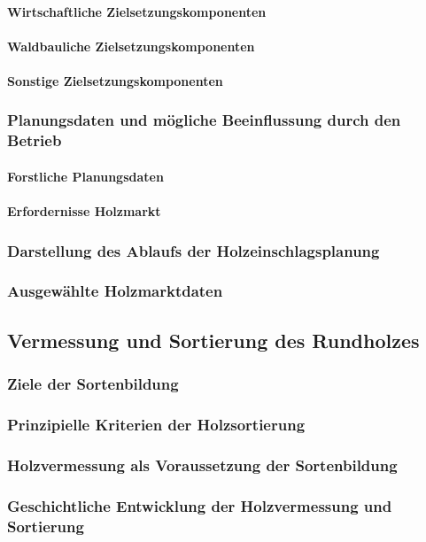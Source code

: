 \documentclass[12pt]{article}
\begin{document}
\paragraph{Wirtschaftliche Zielsetzungskomponenten}
\paragraph{Waldbauliche Zielsetzungskomponenten}
\paragraph{Sonstige Zielsetzungskomponenten}
\subsubsection{Planungsdaten und mögliche Beeinflussung durch den Betrieb}
\paragraph{Forstliche Planungsdaten}
\paragraph{Erfordernisse Holzmarkt}
\subsubsection{Darstellung des Ablaufs der Holzeinschlagsplanung}
\subsubsection{Ausgewählte Holzmarktdaten}
\subsection{Vermessung und Sortierung des Rundholzes}
\subsubsection{Ziele der Sortenbildung}
\subsubsection{Prinzipielle Kriterien der Holzsortierung}
\subsubsection{Holzvermessung als Voraussetzung der Sortenbildung}
\subsubsection{Geschichtliche Entwicklung der Holzvermessung und Sortierung}
\end{document}
